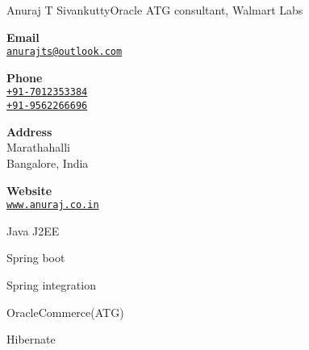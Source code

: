 \documentclass{article}
\begin{document}
\begin{cv}{Anuraj T Sivankutty}{Oracle ATG consultant, Walmart Labs}
\cvseparator[2]



\cvsidebar %



\begin{cvitem}[Envelope][4]
    \textbf{Email}\\
    \href{mailto:anurajts@outlook.com}{\texttt{anurajts@outlook.com}}
\end{cvitem}

\cvseparator[3]
\begin{cvitem}[Phone][4]
    \textbf{Phone}\\
    \href{tel:+917012353384}{\texttt{+91-7012353384}}\\
    \href{tel:+91-9562266696}{\texttt{+91-9562266696}} 
\end{cvitem}

\cvseparator[3]
\begin{cvitem}[Home][4]
    \textbf{Address}\\
    Marathahalli\\ Bangalore, India
\end{cvitem}

\cvseparator[3]
\begin{cvitem}[Globe][4]
    \textbf{Website}\\
    \href{https://anuraj.co.in}{\texttt{www.anuraj.co.in}}
\end{cvitem}



\begin{cvitem}
    Java J2EE
\end{cvitem}

\cvseparator
\begin{cvitem}
    Spring boot
\end{cvitem}
\cvseparator

\begin{cvitem}
Spring integration
\end{cvitem}

\cvseparator
\begin{cvitem}OracleCommerce(ATG) \end{cvitem}

\cvseparator
\begin{cvitem}Hibernate
\end{cvitem}



\end{cv}
\end{document}

